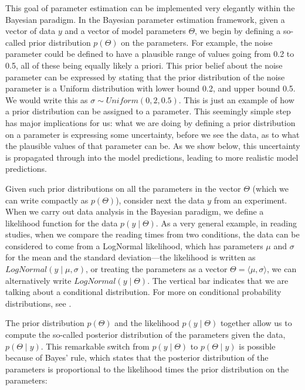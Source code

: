 \documentclass{cambridge7A}\usepackage[]{graphicx}\usepackage[]{color}
\begin{document}
This goal of parameter estimation can be implemented very elegantly within the Bayesian paradigm. In the  Bayesian parameter estimation framework, given a vector of data $y$ and a vector of model parameters $\Theta$, we begin by defining a so-called   prior distribution $p(\Theta)$ on the parameters. For example, the noise parameter could be defined to have a plausible range of values going from 0.2 to 0.5, all of these being equally likely a priori. This prior belief about the noise parameter can be expressed by stating that the prior distribution of the noise parameter is a Uniform distribution with lower bound 0.2, and upper bound 0.5. We would write this as $\sigma \sim Uniform(0,2,0.5)$. This is just an example of how a prior distribution can be assigned to a parameter. This seemingly simple step has major implications for us: what we are doing by defining a prior distribution on a parameter is expressing some uncertainty, before we see the data, as to what the plausible values of that parameter can be. As we show below, this uncertainty is propagated through into the model predictions, leading to more realistic model predictions.  

Given such prior distributions on all the parameters in the vector $\Theta$ (which we can write compactly as $p(\Theta)$), consider next the data $y$ from an experiment. When we carry out data analysis in the Bayesian paradigm, we define a likelihood function for the data $p(y\mid \Theta)$. As a very general example, in reading studies, when we compare the reading times from two conditions, the data can be considered to come from a LogNormal likelihood, which has parameters $\mu$ and $\sigma$ for the mean and the standard deviation---the likelihood is written as $LogNormal(y\mid \mu,\sigma)$, or treating the parameters as a vector $\Theta=\langle \mu,\sigma \rangle$, we can alternatively write $LogNormal(y\mid \Theta)$.  The vertical bar indicates that we are talking about a conditional distribution. For more on conditional probability distributions, see \cite{blitzstein2014introduction}. 

The prior distribution $p(\Theta)$ and the likelihood $p(y\mid \Theta)$ together allow us to compute the so-called  posterior distribution of the parameters given the data,  $p(\Theta\mid y)$. This remarkable switch from $p(y\mid \Theta)$ to $p(\Theta\mid y)$ is possible because of  Bayes' rule, which states that the posterior distribution of the parameters is proportional to the likelihood times the prior distribution on the parameters:
\end{document}
